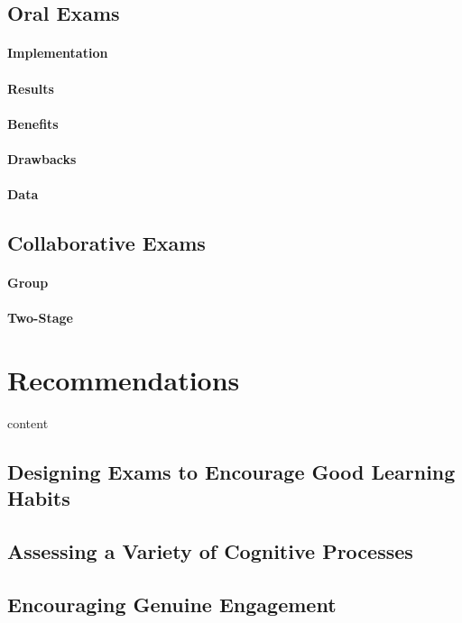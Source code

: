 \documentclass[12pt]{article}
\begin{document}
\subsection{Oral Exams}\label{subsec:oral}
\paragraph{Implementation}
\paragraph{Results}
\paragraph{Benefits}
\paragraph{Drawbacks}
\paragraph{Data}

\subsection{Collaborative Exams}\label{subsec:collab}
\paragraph{Group}
\paragraph{Two-Stage}


\section{Recommendations}\label{sec:recommendations}
content
\subsection{Designing Exams to Encourage Good Learning Habits}
\subsection{Assessing a Variety of Cognitive Processes}
\subsection{Encouraging Genuine Engagement}
\nocite{*}


\end{document}
